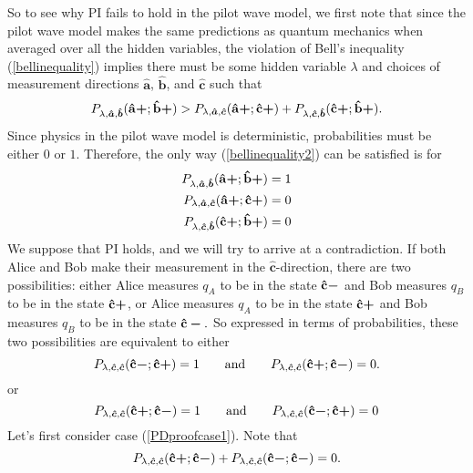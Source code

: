 So to see why PI fails to hold in the pilot wave model, we first note that since the pilot wave model makes the same predictions as quantum mechanics when averaged over all the hidden variables, the violation of Bell's inequality (\ref{bellinequality}) implies there must be some hidden variable $\lambda$ and choices of measurement directions $\bm{\hat{a}}$, $\bm{\hat{b}}$, and $\bm{\hat{c}}$ such that 
 \begin{equation}\label{bellinequality2}
P_{\lambda,\bm{\hat{a}},\bm{\hat{b}}}(\vb{\hat{{a}}}\bm{+};\vb{\hat{{b}}}\bm{+})> P_{\lambda,\bm{\hat{a}},\bm{\hat{c}}}(\vb{\hat{{a}}}\bm{+};\vb{\hat{{c}}}\bm{+})+P_{\lambda,\bm{\hat{c}},\bm{\hat{b}}}(\vb{\hat{{c}}}\bm{+};\vb{\hat{{b}}}\bm{+}).
\end{equation}
Since physics in the pilot wave model is deterministic, probabilities must be either $0$ or $1$. Therefore, the only way (\ref{bellinequality2}) can be satisfied is for
 \begin{align}
P_{\lambda,\bm{\hat{a}},\bm{\hat{b}}}(\vb{\hat{{a}}}\bm{+};\vb{\hat{{b}}}\bm{+})&=1 \label{PDproof1}\\
P_{\lambda,\bm{\hat{a}},\bm{\hat{c}}}(\vb{\hat{{a}}}\bm{+};\vb{\hat{{c}}}\bm{+})&=0 \label{PDproof2}\\
P_{\lambda,\bm{\hat{c}},\bm{\hat{b}}}(\vb{\hat{{c}}}\bm{+};\vb{\hat{{b}}}\bm{+})&=0 \label{PDproof3}
 \end{align}
 We suppose that PI holds, and we will try to arrive at a contradiction. If both Alice and Bob make their measurement in the $\bm{\hat{c}}$-direction, there are two possibilities: either Alice measures $q_A$ to be in the state $\vb{\hat{{c}}}\bm{-}$ and Bob measures $q_B$ to be in the state $\vb{\hat{{c}}}\bm{+}$, or Alice measures $q_A$ to be in the state $\vb{\hat{{c}}}\bm{+}$ and Bob measures $q_B$ to be in the state $\vb{\hat{{c}}}\bm{-}.$ So expressed in terms of probabilities, these two possibilities are equivalent to either 
 \begin{equation}\label{PDproofcase1}
 P_{\lambda,\bm{\hat{c}},\bm{\hat{c}}}(\vb{\hat{{c}}}\bm{-};\vb{\hat{{c}}}\bm{+})=1 \qquad\text{and}\qquad  P_{\lambda,\bm{\hat{c}},\bm{\hat{c}}}(\vb{\hat{{c}}}\bm{+};\vb{\hat{{c}}}\bm{-})=0.
 \end{equation}
 or 
  \begin{equation}\label{PDproofcase2}
 P_{\lambda,\bm{\hat{c}},\bm{\hat{c}}}(\vb{\hat{{c}}}\bm{+};\vb{\hat{{c}}}\bm{-})=1 \qquad\text{and}\qquad P_{\lambda,\bm{\hat{c}},\bm{\hat{c}}}(\vb{\hat{{c}}}\bm{-};\vb{\hat{{c}}}\bm{+})=0
 \end{equation}
 Let's first consider case (\ref{PDproofcase1}). Note that
\begin{equation}
 P_{\lambda,\bm{\hat{c}},\bm{\hat{c}}}(\vb{\hat{{c}}}\bm{+};\vb{\hat{{c}}}\bm{-})+P_{\lambda,\bm{\hat{c}},\bm{\hat{c}}}(\vb{\hat{{c}}}\bm{-};\vb{\hat{{c}}}\bm{-})=0.
\end{equation}
